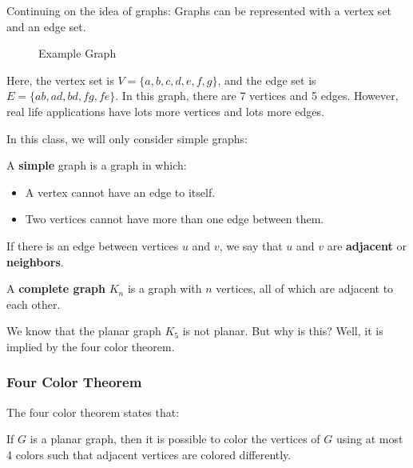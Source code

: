 
Continuing on the idea of graphs: Graphs can be represented with a vertex set and an edge set.

\begin{figure}[ht]
    \centering
    \caption{Example Graph}
    \label{fig:example-graph}
\end{figure}

Here, the vertex set is \( V=\{a, b, c, d, e, f, g\}   \), and the edge set is \( E = \{ab, ad, bd, fg, fe\}   \). In this graph, there are 7 vertices and 5 edges. However, real life applications have lots more vertices and lots more edges. \par

In this class, we will only consider simple graphs:

\begin{definition}
	A \textbf{simple} graph is a graph in which:
	\begin{itemize}
		\item A vertex cannot have an edge to itself.
		\item Two vertices cannot have more than one edge between them.
	\end{itemize}
\end{definition}

\begin{definition}
	If there is an edge between vertices \( u \) and \( v \), we say that \( u \) and \( v \) are \textbf{adjacent} or \textbf{neighbors}.
\end{definition}

\begin{definition}
	A \textbf{complete graph} \( K_n \) is a graph with \( n \) vertices, all of which are adjacent to each other.
\end{definition}

We know that the planar graph \( K_5 \) is not planar. But why is this? Well, it is implied by the four color theorem.

\subsubsection{Four Color Theorem}
The four color theorem states that:
\begin{theorem}
	If \( G \) is a planar graph, then it is possible to color the vertices of \( G \) using at most 4 colors such that adjacent vertices are colored differently.
\end{theorem}

